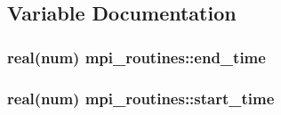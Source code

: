 \subsection{Variable Documentation}
\subsubsection[{\texorpdfstring{end\+\_\+time}{end_time}}]{\setlength{\rightskip}{0pt plus 5cm}real(num) mpi\+\_\+routines\+::end\+\_\+time}\hypertarget{namespacempi__routines_a4b0b516f93006e24d942b3f124cb82d4}{}\label{namespacempi__routines_a4b0b516f93006e24d942b3f124cb82d4}
\subsubsection[{\texorpdfstring{start\+\_\+time}{start_time}}]{\setlength{\rightskip}{0pt plus 5cm}real(num) mpi\+\_\+routines\+::start\+\_\+time}\hypertarget{namespacempi__routines_aa3f567f6443fe088b81d3fb43509a45c}{}\label{namespacempi__routines_aa3f567f6443fe088b81d3fb43509a45c}
